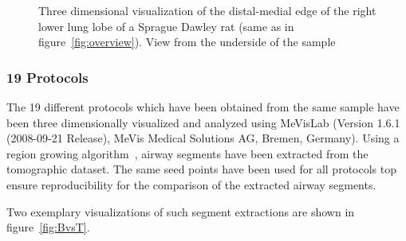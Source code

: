 \begin{figure}
{%
		}%
	\caption{Three dimensional visualization of the distal-medial edge of the right lower lung lobe of a Sprague Dawley rat (same as in figure~\ref{fig:overview}). View from the underside of the sample}
	\label{fig:down}
\end{figure}

\subsubsection{19 Protocols}
The 19 different protocols which have been obtained from the same sample have been three dimensionally visualized and analyzed using MeVisLab (Version 1.6.1 (2008-09-21 Release), MeVis Medical Solutions AG, Bremen, Germany). Using a region growing algorithm~\cite{wiki:regiongrowing}, airway segments have been extracted from the tomographic dataset. The same seed points have been used for all protocols top ensure reproducibility for the comparison of the extracted airway segments.

Two exemplary visualizations of such segment extractions are shown in figure~\ref{fig:BvsT}.

